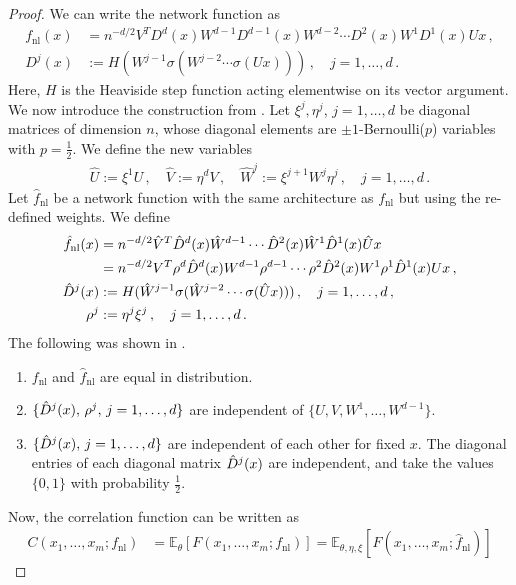 \documentclass[english]{article}
\newcommand{\fnl}{f_{\mathrm{nl}}}
\newcommand{\hfnl}{\hat{f}_{\mathrm{nl}}}
\newcommand{\lexpp}[1]{\mathbb{E}_{#1}\left[}
\newcommand{\rexp}{\right]}
\begin{document}
\begin{proof}
  We can write the network function as
  \begin{align}
    \fnl(x) &= n^{-d/2} V^T D^{d}(x) W^{d-1} D^{d-1}(x) W^{d-2} \cdots D^2(x) W^1 D^1(x) U x \,,
    \\
    D^j(x) &:= H(W^{j-1} \sigma(W^{j-2} \cdots \sigma(U x))) \,,\quad j=1,\dots,d \,.
  \end{align}
  Here, $H$ is the Heaviside step function acting elementwise on its vector argument.
  We now introduce the construction from \cite{hanin2018products}.
  Let $\xi^j,\eta^j$, $j=1,\dots,d$ be diagonal matrices of dimension $n$, whose diagonal elements are $\pm 1$-Bernoulli($p$) variables with $p=\frac{1}{2}$.
  We define the new variables
  \begin{align}
    \hat{U} := \xi^1 U \,,\quad
    \hat{V} := \eta^{d} V \,,\quad
    \hat{W}^j := \xi^{j+1} W^j \eta^j \,,\quad j=1,\dots,d \,.
  \end{align}
  Let $\hfnl$ be a network function with the same architecture as $\fnl$ but using the re-defined weights.
  We define
  \begin{align}
    \hfnl(x) &= n^{-d/2} \hV^T \hD^{d}(x) \hW^{d-1} \cdots \hD^2(x) \hW^1 \hD^1(x) \hU x 
    \\ &= n^{-d/2} V^T \rho^d \hD^{d}(x) W^{d-1} \rho^{d-1} \cdots \rho^2 \hD^2(x) W^1 \rho^1 \hD^1(x) U x \,,
    \\
    \hD^{j}(x) &:= H(\hW^{j-1} \sigma(\hW^{j-2} \cdots \sigma(\hU x))) \,,\quad j=1,\dots,d \,,
    \\
    \rho^j &:= \eta^j \xi^j \,,\quad j=1,\dots,d \,.
  \end{align}
  The following was shown in \cite{hanin2018products}.
  \begin{enumerate}
  \item $\fnl$ and $\hfnl$ are equal in distribution.
  \item $\{\hat{D}^j(x), \, \rho^j, \, j=1,\dots,d\}$ are independent of $\{U,V,W^1,\dots,W^{d-1}\}$.
  \item $\{\hat{D}^j(x), \, j=1,\dots,d\}$ are independent of each other for fixed $x$. 
    The diagonal entries of each diagonal matrix $\hat{D}^j(x)$ are independent, and take the values $\{0,1\}$ with probability $\frac{1}{2}$.
  \end{enumerate}
  Now, the correlation function can be written as
  \begin{align}
    C(x_1,\dots,x_m;\fnl) &= \lexpp{\theta} F(x_1,\dots,x_m;\fnl) \rexp 
    = \lexpp{\theta,\eta,\xi} F(x_1,\dots,x_m;\hfnl) \rexp

\end{align}
\end{proof}
\end{document}
